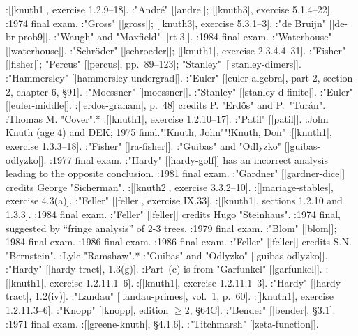 :[|knuth1|, exercise 1.2.9--18].
:"Andr\'e" [|andre|]; [|knuth3|, exercise 5.1.4--22].
:1974 final exam.
:"Gross" [|gross|]; [|knuth3|, exercise 5.3.1--3].
:"de Bruijn" [|de-br-prob9|].
:"Waugh" and "Maxfield" [|rt-3|].
:1984 final exam.
:"Waterhouse" [|waterhouse|].
:"Schr\"oder" [|schroeder|]; [|knuth1|, exercise 2.3.4.4--31].
:"Fisher" [|fisher|]; "Percus" [|percus|, pp.~89--123]; "Stanley"~[|stanley-dimers|].
:"Hammersley" [|hammersley-undergrad|].
:"Euler" [|euler-algebra|, part 2, section 2, chapter 6, \S 91].
:"Moessner" [|moessner|].
:"Stanley" [|stanley-d-finite|].
:"Euler" [|euler-middle|].
:[|erdos-graham|, p.~48] credits P. "Erd\H os" and P.~"Tur\'an".
:Thomas M. "Cover".*
:[|knuth1|, exercise 1.2.10--17].
:"Patil" [|patil|].
:John Knuth (age 4) and DEK; 1975 final."!Knuth, John""!Knuth, Don"
:[|knuth1|, exercise 1.3.3--18].
:"Fisher" [|ra-fisher|].
:"Guibas" and "Odlyzko" [|guibas-odlyzko|].
:1977 final exam.
:"Hardy" [|hardy-golf|] has an incorrect analysis leading to the opposite conclusion.
:1981 final exam.
:"Gardner" [|gardner-dice|] credits George "Sicherman".
:[|knuth2|, exercise 3.3.2--10].
:[|mariage-stables|, exercise 4.3(a)].
:"Feller" [|feller|, exercise IX.33].
:[|knuth1|, sections 1.2.10 and 1.3.3].
:1984 final exam.
:"Feller" [|feller|] credits Hugo "Steinhaus".
:1974 final, suggested by ``fringe analysis'' of 2-3 trees.
:1979 final exam.
:"Blom" [|blom|]; 1984 final exam.
:1986 final exam.
:1986 final exam.
:"Feller" [|feller|] credits S.\thinspace N. "Bernstein".
:Lyle "Ramshaw".*
:"Guibas" and "Odlyzko" [|guibas-odlyzko|].
:"Hardy" [|hardy-tract|, 1.3(g)].
:Part~(c) is from "Garfunkel" [|garfunkel|].
:[|knuth1|, exercise 1.2.11.1--6].
:[|knuth1|, exercise 1.2.11.1--3].
:"Hardy" [|hardy-tract|, 1.2(iv)].
:"Landau" [|landau-primes|, vol.~1, p.~60].
:[|knuth1|, exercise 1.2.11.3--6].
:"Knopp" [|knopp|, edition $\ge 2$, \S 64C].
:"Bender" [|bender|, \S 3.1].
:1971 final exam.
:[|greene-knuth|, \S 4.1.6].
:"Titchmarsh" [|zeta-function|].
